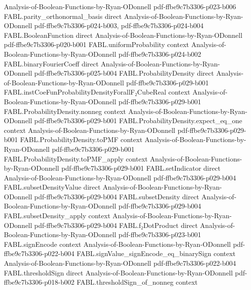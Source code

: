 \begin{theorem}
  {Analysis-of-Boolean-Functions-by-Ryan-ODonnell}
  {pdf-ffbe9c7b3306-p023-b006}
\proofstep
  {FABL.parity_orthonormal_basis}
  {direct}
  {Analysis-of-Boolean-Functions-by-Ryan-ODonnell}
  {pdf-ffbe9c7b3306-p024-b003,
    pdf-ffbe9c7b3306-p024-b004}
\proofstep
  {FABL.BooleanFunction}
  {direct}
  {Analysis-of-Boolean-Functions-by-Ryan-ODonnell}
  {pdf-ffbe9c7b3306-p020-b001}
\proofstep
  {FABL.uniformProbability}
  {context}
  {Analysis-of-Boolean-Functions-by-Ryan-ODonnell}
  {pdf-ffbe9c7b3306-p024-b002}
\proofstep
  {FABL.binaryFourierCoeff}
  {direct}
  {Analysis-of-Boolean-Functions-by-Ryan-ODonnell}
  {pdf-ffbe9c7b3306-p025-b004}
\proofstep
  {FABL.ProbabilityDensity}
  {direct}
  {Analysis-of-Boolean-Functions-by-Ryan-ODonnell}
  {pdf-ffbe9c7b3306-p029-b001}
\proofstep
  {FABL.instCoeFunProbabilityDensityForallF₂CubeReal}
  {context}
  {Analysis-of-Boolean-Functions-by-Ryan-ODonnell}
  {pdf-ffbe9c7b3306-p029-b001}
\proofstep
  {FABL.ProbabilityDensity.nonneg}
  {context}
  {Analysis-of-Boolean-Functions-by-Ryan-ODonnell}
  {pdf-ffbe9c7b3306-p029-b001}
\proofstep
  {FABL.ProbabilityDensity.expect_eq_one}
  {context}
  {Analysis-of-Boolean-Functions-by-Ryan-ODonnell}
  {pdf-ffbe9c7b3306-p029-b001}
\proofstep
  {FABL.ProbabilityDensity.toPMF}
  {context}
  {Analysis-of-Boolean-Functions-by-Ryan-ODonnell}
  {pdf-ffbe9c7b3306-p029-b001}
\proofstep
  {FABL.ProbabilityDensity.toPMF_apply}
  {context}
  {Analysis-of-Boolean-Functions-by-Ryan-ODonnell}
  {pdf-ffbe9c7b3306-p029-b001}
\proofstep
  {FABL.setIndicator}
  {direct}
  {Analysis-of-Boolean-Functions-by-Ryan-ODonnell}
  {pdf-ffbe9c7b3306-p029-b004}
\proofstep
  {FABL.subsetDensityValue}
  {direct}
  {Analysis-of-Boolean-Functions-by-Ryan-ODonnell}
  {pdf-ffbe9c7b3306-p029-b004}
\proofstep
  {FABL.subsetDensity}
  {direct}
  {Analysis-of-Boolean-Functions-by-Ryan-ODonnell}
  {pdf-ffbe9c7b3306-p029-b004}
\proofstep
  {FABL.subsetDensity_apply}
  {context}
  {Analysis-of-Boolean-Functions-by-Ryan-ODonnell}
  {pdf-ffbe9c7b3306-p029-b004}
\proofstep
  {FABL.f₂DotProduct}
  {direct}
  {Analysis-of-Boolean-Functions-by-Ryan-ODonnell}
  {pdf-ffbe9c7b3306-p023-b001}
\proofstep
  {FABL.signEncode}
  {context}
  {Analysis-of-Boolean-Functions-by-Ryan-ODonnell}
  {pdf-ffbe9c7b3306-p022-b004}
\proofstep
  {FABL.signValue_signEncode_eq_binarySign}
  {context}
  {Analysis-of-Boolean-Functions-by-Ryan-ODonnell}
  {pdf-ffbe9c7b3306-p022-b004}
\proofstep
  {FABL.thresholdSign}
  {direct}
  {Analysis-of-Boolean-Functions-by-Ryan-ODonnell}
  {pdf-ffbe9c7b3306-p018-b002}
\proofstep
  {FABL.thresholdSign_of_nonneg}
  {context}

\end{theorem}
